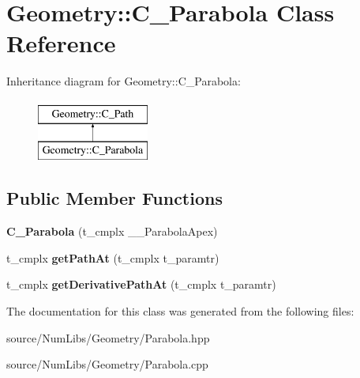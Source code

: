 \hypertarget{class_geometry_1_1_c___parabola}{\section{Geometry\-:\-:C\-\_\-\-Parabola Class Reference}
\label{class_geometry_1_1_c___parabola}
}
Inheritance diagram for Geometry\-:\-:C\-\_\-\-Parabola\-:\begin{figure}[H]
\begin{center}
\leavevmode
\includegraphics[height=2.000000cm]{class_geometry_1_1_c___parabola}
\end{center}
\end{figure}
\subsection*{Public Member Functions}
\begin{DoxyCompactItemize}
\item 
\hypertarget{class_geometry_1_1_c___parabola_af2dbf3b230334f8c68a116dbe6d21490}{{\bfseries C\-\_\-\-Parabola} (t\-\_\-cmplx \-\_\-\-\_\-\-Parabola\-Apex)}\label{class_geometry_1_1_c___parabola_af2dbf3b230334f8c68a116dbe6d21490}

\item 
\hypertarget{class_geometry_1_1_c___parabola_a387364d860d1fdd83294af454635acb0}{t\-\_\-cmplx {\bfseries get\-Path\-At} (t\-\_\-cmplx t\-\_\-paramtr)}\label{class_geometry_1_1_c___parabola_a387364d860d1fdd83294af454635acb0}

\item 
\hypertarget{class_geometry_1_1_c___parabola_a783b277435ef183353620f94471e3d7d}{t\-\_\-cmplx {\bfseries get\-Derivative\-Path\-At} (t\-\_\-cmplx t\-\_\-paramtr)}\label{class_geometry_1_1_c___parabola_a783b277435ef183353620f94471e3d7d}

\end{DoxyCompactItemize}


The documentation for this class was generated from the following files\-:\begin{DoxyCompactItemize}
\item 
source/\-Num\-Libs/\-Geometry/Parabola.\-hpp\item 
source/\-Num\-Libs/\-Geometry/Parabola.\-cpp\end{DoxyCompactItemize}
